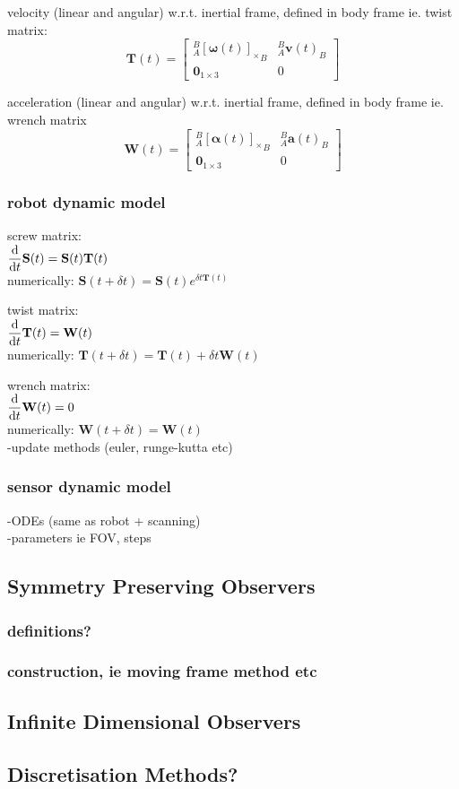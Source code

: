 		velocity (linear and angular) w.r.t. inertial frame, defined in body frame ie. twist matrix:
		\begin{equation}
				\mathbf{T}(t) = 
				\begin{bmatrix}
		  ^{B}_{A}{[\mathbf{\omega}(t)]_\times}^{}_{B} 	& 	^{B}_{A}\mathbf{v}(t)^{}_{B}\\
		  \textbf{0}_{1 \times 3} & 0						  
				\end{bmatrix}
		\end{equation}
				
		acceleration (linear and angular) w.r.t. inertial frame, defined in body frame ie. wrench matrix
		\begin{equation}
				\mathbf{W}(t) = 
				\begin{bmatrix}
				  ^{B}_{A}{[\mathbf{\alpha}(t)]_\times}^{}_{B} 	& 	^{B}_{A}\mathbf{a}(t)^{}_{B}\\
				  \textbf{0}_{1 \times 3} & 0						  
				\end{bmatrix}
		\end{equation}
		
				
	\subsubsection{robot dynamic model}
		screw matrix:\\
		$ \dfrac{\textnormal{d}}{\textnormal{d}t}\mathbf{S}(t)=\mathbf{S}(t)\mathbf{T}(t)$\\
		numerically: $\mathbf{S}(t+\delta t) = \mathbf{S}(t)e^{\delta t\mathbf{T}(t)}$
		
		twist matrix:\\
		$ \dfrac{\textnormal{d}}{\textnormal{d}t}\mathbf{T}(t)=\mathbf{W}(t)$\\
		numerically: $\mathbf{T}(t+\delta t) = \mathbf{T}(t) + \delta t\mathbf{W}(t)$
		
		wrench matrix:\\
		$ \dfrac{\textnormal{d}}{\textnormal{d}t}\mathbf{W}(t)=0$\\
		numerically: $\mathbf{W}(t+\delta t) = \mathbf{W}(t)$\\
		-update methods (euler, runge-kutta etc)
	\subsubsection{sensor dynamic model}
		-ODEs (same as robot + scanning)\\
		-parameters ie FOV, steps
\subsection{Symmetry Preserving Observers}
	\subsubsection{definitions?}
	\subsubsection{construction, ie moving frame method etc}
\subsection{Infinite Dimensional Observers}
\subsection{Discretisation Methods?}